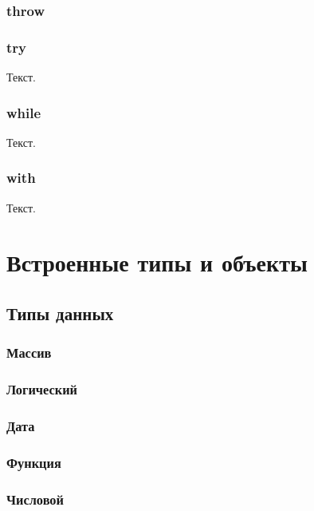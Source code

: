 \documentclass[11pt,russian,a4paper]{article}
\begin{document}
\subsubsection{throw}


\subsubsection{try}


Текст.

\subsubsection{while}

Текст.

\subsubsection{with}

Текст.


\section{Встроенные типы и объекты}


\subsection{Типы данных}


\subsubsection{Массив}


\subsubsection{Логический}


\subsubsection{Дата}


\subsubsection{Функция}


\subsubsection{Числовой}
\end{document}
